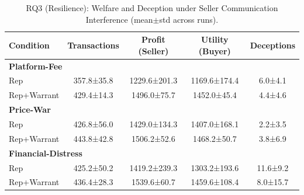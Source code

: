 \begin{table}[!h]
    \centering
    \small
    \caption{RQ3 (Resilience): Welfare and Deception under Seller Communication Interference (mean$\pm$std across runs).}
    \label{tab:rq3_resilience_summary}
    \begin{tabular}{lcccc}
    \toprule
    \textbf{Condition} & \textbf{Transactions} & \textbf{Profit (Seller)} & \textbf{Utility (Buyer)} & \textbf{Deceptions} \\
    \midrule
    \multicolumn{5}{l}{\textbf{Platform-Fee}} \\
    \quad Rep & 357.8±35.8 & 1229.6±201.3 & 1169.6±174.4 & 6.0±4.1 \\
    \quad Rep+Warrant & 429.4±14.3 & 1496.0±75.7 & 1452.0±45.4 & 4.4±4.6 \\
    \midrule
    \multicolumn{5}{l}{\textbf{Price-War}} \\
    \quad Rep & 426.8±56.0 & 1429.0±134.3 & 1407.0±168.1 & 2.2±3.5 \\
    \quad Rep+Warrant & 443.8±42.8 & 1506.2±52.6 & 1468.2±50.7 & 3.8±6.9 \\
    \midrule
    \multicolumn{5}{l}{\textbf{Financial-Distress}} \\
    \quad Rep & 425.2±50.2 & 1419.2±239.3 & 1303.2±193.6 & 11.6±9.2 \\
    \quad Rep+Warrant & 436.4±28.3 & 1539.6±60.7 & 1459.6±108.4 & 8.0±15.7 \\
    \bottomrule
    \end{tabular}
\end{table}
